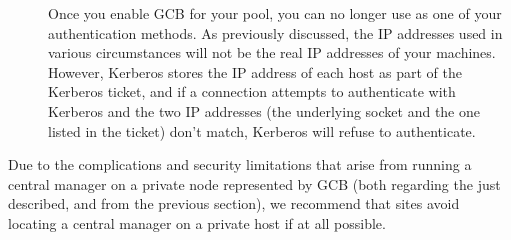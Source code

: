 \begin{description}
\item[]
  Once you enable GCB for your pool, you can no longer use
  \verb@KERBEROS@ as one of your authentication methods.
  As previously discussed, the IP addresses used in various
  circumstances will not be the real IP addresses of your machines.
  However, Kerberos stores the IP address of each host as part of the
  Kerberos ticket, and if a connection attempts to authenticate with
  Kerberos and the two IP addresses (the underlying socket and the one
  listed in the ticket) don't match, Kerberos will refuse to
  authenticate.

\end{description}

Due to the complications and security limitations that arise from
running a central manager on a private node represented by GCB (both
regarding the  just described, and
 from the previous section), we
recommend that sites avoid locating a central manager on a private
host if at all possible.

